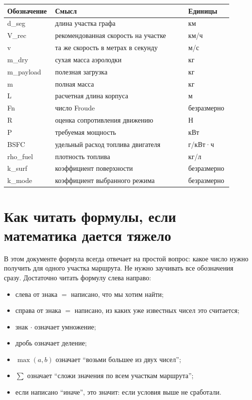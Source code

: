 \documentclass[12pt,a4paper]{article}
\begin{document}
\begin{center}
\begin{tabular}{>{\ttfamily}p{0.18\linewidth}p{0.58\linewidth}p{0.16\linewidth}}
\toprule
\textnormal{Обозначение} & Смысл & Единицы \\
\midrule
d\_seg & длина участка графа & км \\
V\_rec & рекомендованная скорость на участке & км/ч \\
v & та же скорость в метрах в секунду & м/с \\
m\_dry & сухая масса аэролодки & кг \\
m\_payload & полезная загрузка & кг \\
m & полная масса & кг \\
L & расчетная длина корпуса & м \\
Fn & число Froude & безразмерно \\
R & оценка сопротивления движению & Н \\
P & требуемая мощность & кВт \\
BSFC & удельный расход топлива двигателя & г/кВт·ч \\
rho\_fuel & плотность топлива & кг/л \\
k\_surf & коэффициент поверхности & безразмерно \\
k\_mode & коэффициент выбранного режима & безразмерно \\
\bottomrule
\end{tabular}
\end{center}

\section{Как читать формулы, если математика дается тяжело}

В этом документе формула всегда отвечает на простой вопрос: какое число нужно
получить для одного участка маршрута. Не нужно заучивать все обозначения сразу.
Достаточно читать формулу слева направо:

\begin{itemize}
  \item слева от знака \(=\) написано, что мы хотим найти;
  \item справа от знака \(=\) написано, из каких уже известных чисел это считается;
  \item знак \(\cdot\) означает умножение;
  \item дробь означает деление;
  \item \(\max(a,b)\) означает ``возьми большее из двух чисел'';
  \item \(\sum\) означает ``сложи значения по всем участкам маршрута'';
  \item если написано ``иначе'', это значит: если условия выше не сработали.
\end{itemize}
\end{document}
